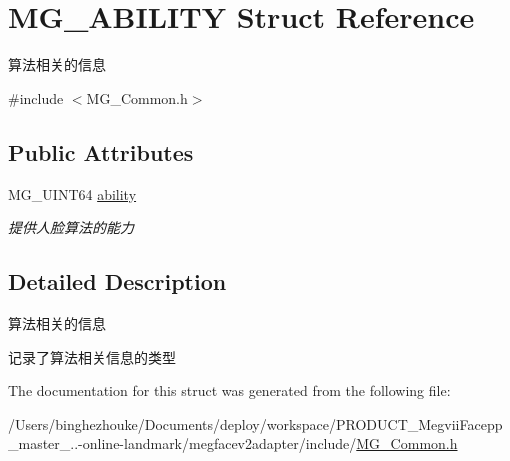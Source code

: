 \hypertarget{struct_m_g___a_b_i_l_i_t_y}{}\section{M\+G\+\_\+\+A\+B\+I\+L\+I\+TY Struct Reference}
\label{struct_m_g___a_b_i_l_i_t_y}


算法相关的信息  




{\ttfamily \#include $<$M\+G\+\_\+\+Common.\+h$>$}

\subsection*{Public Attributes}
\begin{DoxyCompactItemize}
\item 
\mbox{\label{struct_m_g___a_b_i_l_i_t_y_af734c4768b5313bdc14ab930ea484013}} 
M\+G\+\_\+\+U\+I\+N\+T64 \hyperlink{struct_m_g___a_b_i_l_i_t_y_af734c4768b5313bdc14ab930ea484013}{ability}
\begin{DoxyCompactList}\small\item\em 提供人脸算法的能力 \end{DoxyCompactList}\end{DoxyCompactItemize}


\subsection{Detailed Description}
算法相关的信息 

记录了算法相关信息的类型 

The documentation for this struct was generated from the following file\+:\begin{DoxyCompactItemize}
\item 
/\+Users/binghezhouke/\+Documents/deploy/workspace/\+P\+R\+O\+D\+U\+C\+T\+\_\+\+Megvii\+Facepp\+\_\+master\+\_..-\/online-\/landmark/megfacev2adapter/include/\hyperlink{_m_g___common_8h}{M\+G\+\_\+\+Common.\+h}\end{DoxyCompactItemize}
